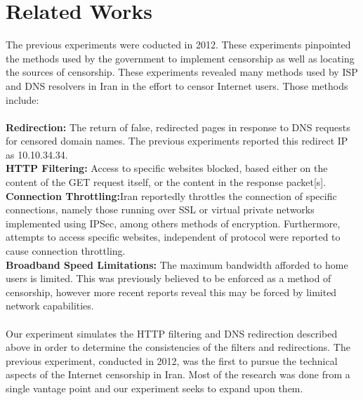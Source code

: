 \section{Related Works}\label{sec:relatedworks}

The previous experiments were coducted in 2012. These experiments pinpointed the methods used by the government to implement censorship as well as locating the sources of censorship. These experiments revealed many methods used by ISP and DNS resolvers in Iran in the effort to censor Internet users. Those methods include:\\
\\
\textbf{Redirection:} The return of false, redirected pages in response to DNS requests for censored domain names. The previous experiments reported this redirect IP as 10.10.34.34.\\
\textbf{HTTP Filtering:} Access to specific websites blocked, based either on the content of the GET request itself, or the content in the response packet[s].\\
\textbf{Connection Throttling:}Iran reportedly throttles the connection of specific connections, namely those running over SSL or virtual private networks implemented using IPSec, among others methods of encryption. Furthermore, attempts to access specific websites, independent of protocol were reported to cause connection throttling.\\
\textbf{Broadband Speed Limitations:} The maximum bandwidth afforded to home user\textquotesingle s is limited. This was previously believed to be enforced as a method of censorship, however more recent reports reveal this may be forced by limited network capabilities.\\
\\
Our experiment simulates the HTTP filtering and DNS redirection described above in order to determine the consistencies of the filters and redirections. The previous experiment, conducted in 2012, was the first to pursue the technical aspects of the Internet censorship in Iran. Most of the research was done from a single vantage point and our experiment seeks to expand upon them.\\